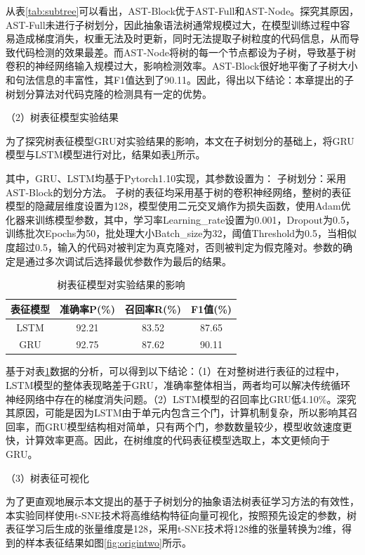 从表\ref{tab:subtree}可以看出，AST-Block优于AST-Full和AST-Node。探究其原因，AST-Full未进行子树划分，因此抽象语法树通常规模过大，在模型训练过程中容易造成梯度消失，权重无法及时更新，同时无法提取子树粒度的代码信息，从而导致代码检测的效果最差。而AST-Node将树的每一个节点都设为子树，导致基于树卷积的神经网络输入规模过大，影响检测效率。AST-Block很好地平衡了子树大小和句法信息的丰富性，其F1值达到了90.11。因此，得出以下结论：本章提出的子树划分算法对代码克隆的检测具有一定的优势。

（2）树表征模型实验结果

为了探究树表征模型GRU对实验结果的影响，本文在子树划分的基础上，将GRU模型与LSTM模型进行对比，结果如表\ref{tab:tree2}所示。

其中，GRU、LSTM均基于Pytorch1.10实现，其参数设置为： 子树划分：采用AST-Block的划分方法。 子树的表征均采用基于树的卷积神经网络，整树的表征模型的隐藏层维度设置为128，模型使用二元交叉熵作为损失函数，使用Adam优化器来训练模型参数，其中，学习率Learning\_rate设置为0.001，Dropout为0.5，训练批次Epochs为50，批处理大小Batch\_size为32，阈值Threshold为0.5，当相似度超过0.5，输入的代码对被判定为真克隆对，否则被判定为假克隆对。参数的确定是通过多次调试后选择最优参数作为最后的结果。

\begin{table}[htp]  
  \centering  
  \caption{树表征模型对实验结果的影响}   
  \label{tab:tree2}
  \begin{tabular*}{0.9\textwidth}{@{\extracolsep{\fill}}cccc}  
  \toprule  
  表征模型 & 准确率P(\%) & 召回率R(\%) & F1值(\%)  \\  
  \midrule
  LSTM			  & 92.21	  & 83.52	 & 87.65		\\  
  GRU		      & 92.75	  & 87.62	 & 90.11 \\ 
  \bottomrule  
  \end{tabular*}  
\end{table}

基于对表\ref{tab:tree2}数据的分析，可以得到以下结论：（1）在对整树进行表征的过程中，LSTM模型的整体表现略差于GRU，准确率整体相当，两者均可以解决传统循环神经网络中存在的梯度消失问题。（2）LSTM模型的召回率比GRU低4.10\%。深究其原因，可能是因为LSTM由于单元内包含三个门，计算机制复杂，所以影响其召回率，而GRU模型结构相对简单，只有两个门，参数数量较少，模型收敛速度更快，计算效率更高。因此，在树维度的代码表征模型选取上，本文更倾向于GRU。


（3）树表征可视化

为了更直观地展示本文提出的基于子树划分的抽象语法树表征学习方法的有效性，本实验同样使用t-SNE技术将高维结构特征向量可视化，按照预先设定的参数，树表征学习后生成的张量维度是128，采用t-SNE技术将128维的张量转换为2维，得到的样本表征结果如图\ref{fig:origintwo}所示。

